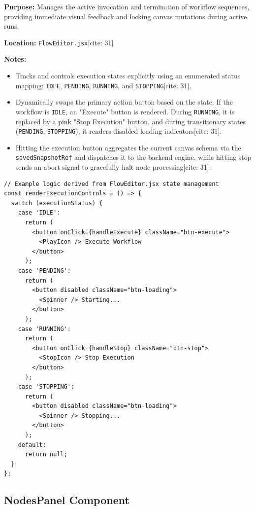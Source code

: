 \textbf{Purpose:} Manages the active invocation and termination of workflow sequences, providing immediate visual feedback and locking canvas mutations during active runs.

\vspace{0.2cm}
\noindent\textbf{Location:} \texttt{FlowEditor.jsx}[cite: 31]

\vspace{0.2cm}
\noindent\textbf{Notes:}
\begin{itemize}
    \item Tracks and controls execution states explicitly using an enumerated status mapping: \texttt{IDLE}, \texttt{PENDING}, \texttt{RUNNING}, and \texttt{STOPPING}[cite: 31].
    \item Dynamically swaps the primary action button based on the state. If the workflow is \texttt{IDLE}, an "Execute" button is rendered. During \texttt{RUNNING}, it is replaced by a pink "Stop Execution" button, and during transitionary states (\texttt{PENDING}, \texttt{STOPPING}), it renders disabled loading indicators[cite: 31].
    \item Hitting the execution button aggregates the current canvas schema via the \texttt{savedSnapshotRef} and dispatches it to the backend engine, while hitting stop sends an abort signal to gracefully halt node processing[cite: 31].
\end{itemize}

\begin{lstlisting}
// Example logic derived from FlowEditor.jsx state management
const renderExecutionControls = () => {
  switch (executionStatus) {
    case 'IDLE':
      return (
        <button onClick={handleExecute} className="btn-execute">
          <PlayIcon /> Execute Workflow
        </button>
      );
    case 'PENDING':
      return (
        <button disabled className="btn-loading">
          <Spinner /> Starting...
        </button>
      );
    case 'RUNNING':
      return (
        <button onClick={handleStop} className="btn-stop">
          <StopIcon /> Stop Execution
        </button>
      );
    case 'STOPPING':
      return (
        <button disabled className="btn-loading">
          <Spinner /> Stopping...
        </button>
      );
    default:
      return null;
  }
};
\end{lstlisting}

\subsection*{NodesPanel Component}

